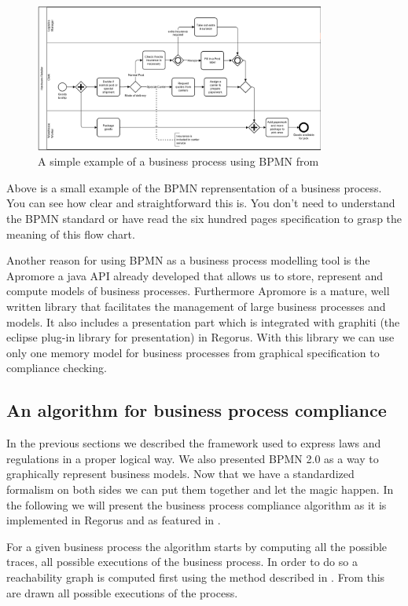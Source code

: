 \documentclass[10pt]{report}
\begin{document}
\begin{figure}[h!]
\centering
\includegraphics[width=0.85\textwidth]{BPMNex.png}
\caption{A simple example of a business process using BPMN from \autocite{BPMNexample}}
\end{figure}

Above is a small example of the BPMN reprensentation of a business process. You can see how clear and straightforward this is. You don't need to understand the BPMN standard or have read the six hundred pages specification to grasp the meaning of this flow chart.

Another reason for using BPMN as a business process modelling tool is the Apromore a java API already developed that allows us to store, represent and compute models of business processes. Furthermore Apromore is a mature, well written library that facilitates the management of large business processes and models. It also includes a presentation part which is integrated with graphiti (the eclipse plug-in library for presentation) in Regorus. With this library we can use only one memory model for business processes from graphical specification to compliance checking. \autocite{ApromoreWebsite}



\subsection{An algorithm for business process compliance}
In the previous sections we described the framework used to express laws and regulations in a proper logical way. We also presented BPMN 2.0 as a way to graphically represent business models. Now that we have a standardized formalism on both sides we can put them together and let the magic happen. In the following we will present the business process compliance algorithm as it is implemented in Regorus and as featured in \autocite{ConceptuallyRichModelofBPC}.

For a given business process the algorithm starts by computing all the possible traces, all possible executions of the business process. In order to do so a reachability graph is computed first using the method described in \autocite{sweepline2004}. From this are drawn all possible executions of the process. 
\end{document}
